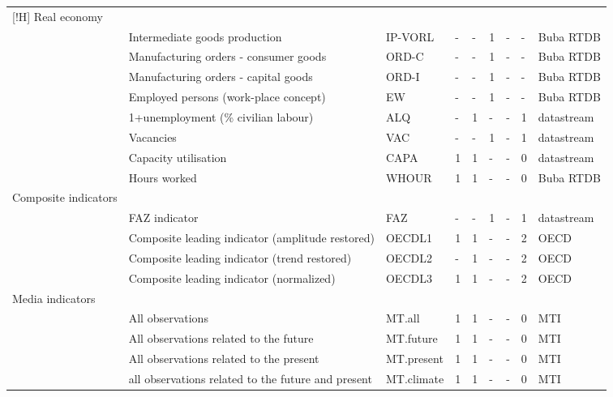 \documentclass[10pt]{article}
\begin{document}
\begin{footnotesize}
\begin{longtable}{p{1in}|p{2.5in}|p{1in}|p{.1in}|p{.1in}|p{.1in}|p{.15in}|p{.1in}|p{.5in}}[!H]
{\tiny{}Real economy} &  &  &  &  &  &  &  & \tabularnewline
 & {\tiny{}Intermediate goods production} & {\tiny{}IP-VORL} & {\tiny{}-} & {\tiny{}-} & {\tiny{}1} & {\tiny{}-} & {\tiny{}-} & {\tiny{}Buba RTDB}\tabularnewline
 & {\tiny{}Manufacturing orders - consumer goods} & {\tiny{}ORD-C} & {\tiny{}-} & {\tiny{}-} & {\tiny{}1} & {\tiny{}-} & {\tiny{}-} & {\tiny{}Buba RTDB}\tabularnewline
 & {\tiny{}Manufacturing orders - capital goods} & {\tiny{}ORD-I} & {\tiny{}-} & {\tiny{}-} & {\tiny{}1} & {\tiny{}-} & {\tiny{}-} & {\tiny{}Buba RTDB}\tabularnewline
 & {\tiny{}Employed persons (work-place concept)} & {\tiny{}EW} & {\tiny{}-} & {\tiny{}-} & {\tiny{}1} & {\tiny{}-} & {\tiny{}-} & {\tiny{}Buba RTDB}\tabularnewline
 & {\tiny{}1+unemployment (\% civilian labour)} & {\tiny{}ALQ} & {\tiny{}-} & {\tiny{}1} & {\tiny{}-} & {\tiny{}-} & {\tiny{}1} & {\tiny{}datastream}\tabularnewline
 & {\tiny{}Vacancies} & {\tiny{}VAC} & {\tiny{}-} & {\tiny{}-} & {\tiny{}1} & {\tiny{}-} & {\tiny{}1} & {\tiny{}datastream}\tabularnewline
 & {\tiny{}Capacity utilisation} & {\tiny{}CAPA} & {\tiny{}1} & {\tiny{}1} & {\tiny{}-} & {\tiny{}-} & {\tiny{}0} & {\tiny{}datastream}\tabularnewline
 & {\tiny{}Hours worked} & {\tiny{}WHOUR} & {\tiny{}1} & {\tiny{}1} & {\tiny{}-} & {\tiny{}-} & {\tiny{}0} & {\tiny{}Buba RTDB}\tabularnewline
{\tiny{}Composite indicators} &  &  &  &  &  &  &  & \tabularnewline
 & {\tiny{}FAZ indicator} & {\tiny{}FAZ} & {\tiny{}-} & {\tiny{}-} & {\tiny{}1} & {\tiny{}-} & {\tiny{}1} & {\tiny{}datastream}\tabularnewline
 & {\tiny{}Composite leading indicator (amplitude restored)} & {\tiny{}OECDL1} & {\tiny{}1} & {\tiny{}1} & {\tiny{}-} & {\tiny{}-} & {\tiny{}2} & {\tiny{}OECD}\tabularnewline
 & {\tiny{}Composite leading indicator (trend restored)} & {\tiny{}OECDL2} & {\tiny{}-} & {\tiny{}1} & {\tiny{}-} & {\tiny{}-} & {\tiny{}2} & {\tiny{}OECD}\tabularnewline
 & {\tiny{}Composite leading indicator (normalized)} & {\tiny{}OECDL3} & {\tiny{}1} & {\tiny{}1} & {\tiny{}-} & {\tiny{}-} & {\tiny{}2} & {\tiny{}OECD}\tabularnewline
{\tiny{}Media indicators} &  &  &  &  &  &  &  & \tabularnewline
 & {\tiny{}All observations} & {\tiny{}MT.all} & {\tiny{}1} & {\tiny{}1} & {\tiny{}-} & {\tiny{}-} & {\tiny{}0} & {\tiny{}MTI}\tabularnewline
 & {\tiny{}All observations related to the future} & {\tiny{}MT.future} & {\tiny{}1} & {\tiny{}1} & {\tiny{}-} & {\tiny{}-} & {\tiny{}0} & {\tiny{}MTI}\tabularnewline
 & {\tiny{}All observations related to the present} & {\tiny{}MT.present} & {\tiny{}1} & {\tiny{}1} & {\tiny{}-} & {\tiny{}-} & {\tiny{}0} & {\tiny{}MTI}\tabularnewline
 & {\tiny{}all observations related to the future and present} & {\tiny{}MT.climate} & {\tiny{}1} & {\tiny{}1} & {\tiny{}-} & {\tiny{}-} & {\tiny{}0} & {\tiny{}MTI}\tabularnewline

\end{longtable}
\end{footnotesize}
\end{document}
